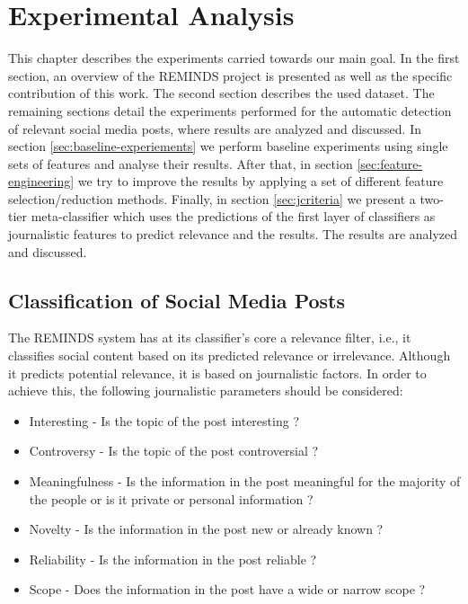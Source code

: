 

\chapter{Experimental Analysis}

\label{experimental_analysis} %


This chapter describes the experiments carried towards our main goal. In the first section, an overview of the REMINDS project is presented as well as the specific contribution of this work. The second section describes the used dataset. The remaining sections detail the experiments performed for the automatic detection of relevant social media posts, where results are analyzed and discussed. In section \ref{sec:baseline-experiements} we perform baseline experiments using single sets of features and analyse their results. After that, in section \ref{sec:feature-engineering} we try to improve the results by applying a set of different feature selection/reduction methods. Finally, in section \ref{sec:jcriteria} we present a two-tier meta-classifier which uses the predictions of the first layer of classifiers as journalistic features to predict relevance and the results. The results are analyzed and discussed.

\section*{Classification of Social Media Posts}
The REMINDS system has at its classifier's core a relevance filter, i.e., it classifies social content based on its predicted relevance or irrelevance. Although it predicts potential relevance, it is based on journalistic factors. In order to achieve this, the following journalistic parameters should be considered:

\begin{itemize}
	\item Interesting - Is the topic of the post interesting ?
	\item Controversy - Is the topic of the post controversial ?
    \item Meaningfulness - Is the information in the post meaningful for the majority of the people or is it private or personal information ?
    \item Novelty - Is the information in the post new or already known ?
    \item Reliability - Is the information in the post reliable ?
	\item Scope - Does the information in the post have a wide or narrow scope ? 
\end{itemize} 

